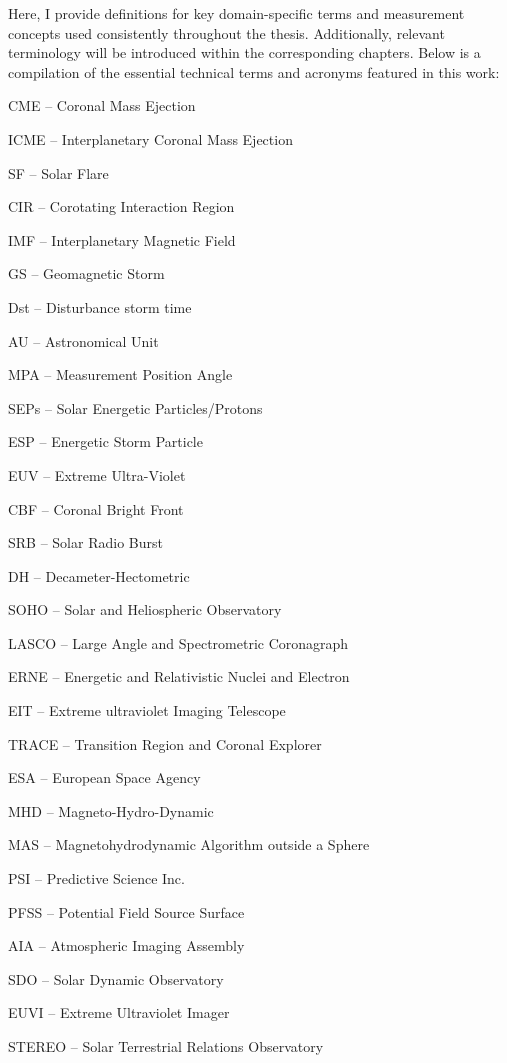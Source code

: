 Here, I provide definitions for key domain-specific terms and measurement concepts used consistently throughout the thesis. Additionally, relevant terminology will be introduced within the corresponding chapters. Below is a compilation of the essential technical terms and acronyms featured in this work:

\vspace{0.5cm}

CME -- Coronal Mass Ejection

ICME -- Interplanetary Coronal Mass Ejection

SF -- Solar Flare

CIR -- Corotating Interaction Region

IMF -- Interplanetary Magnetic Field

GS -- Geomagnetic Storm

Dst -- Disturbance storm time

AU -- Astronomical Unit

MPA -- Measurement Position Angle

SEPs -- Solar Energetic Particles/Protons

ESP -- Energetic Storm Particle

EUV -- Extreme Ultra-Violet

CBF -- Coronal Bright Front

SRB -- Solar Radio Burst

DH -- Decameter-Hectometric

SOHO -- Solar and Heliospheric Observatory

LASCO -- Large Angle and Spectrometric Coronagraph

ERNE -- Energetic and Relativistic Nuclei and Electron

EIT -- Extreme ultraviolet Imaging Telescope

TRACE -- Transition Region and Coronal Explorer

ESA -- European Space Agency

MHD -- Magneto-Hydro-Dynamic

MAS -- Magnetohydrodynamic Algorithm outside a Sphere

PSI -- Predictive Science Inc.

PFSS -- Potential Field Source Surface

AIA -- Atmospheric Imaging Assembly

SDO -- Solar Dynamic Observatory

EUVI -- Extreme Ultraviolet Imager

STEREO -- Solar Terrestrial Relations Observatory

